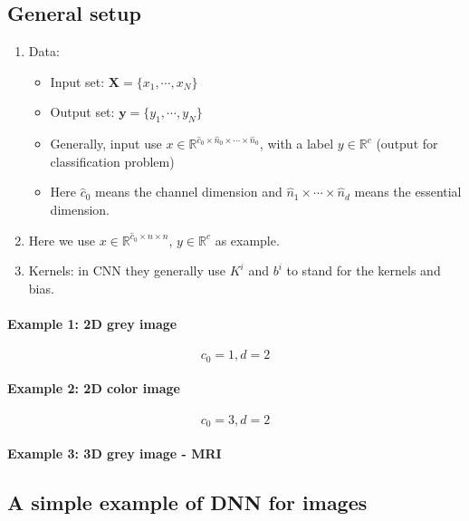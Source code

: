 \subsection{General setup}
\begin{enumerate}
	\item Data:
	\begin{itemize}
		\item Input set: $\bm{X} = \{x_1, \cdots, x_N\}$
		\item Output set: $\bm{y} =  \{y_1, \cdots, y_N\}$
		\item Generally,  input use $x \in \mathbb{R}^{\hat c_0 \times \hat n_0\times \cdots \times \hat n_0 }$, with a label $y \in \mathbb{R}^c$ (output for classification problem)
		\item Here $\hat c_0$ means the channel dimension and $\hat n_1\times \cdots \times \hat n_d$ means the essential dimension.
	\end{itemize}
	\item Here we use $x \in \mathbb{R}^{\hat c_0 \times n \times n} $,
	$y \in \mathbb{R}^c$ as example.
	\item Kernels: in CNN they generally use $K^i$ and $b^i$ to stand for the kernels and bias.  
\end{enumerate}

\paragraph{Example 1: 2D grey image}
\begin{equation}\label{2DGreyImage}
c_0=1, d=2  
\end{equation}
\paragraph{Example 2: 2D color image}
\begin{equation}\label{2DColorImage}
c_0=3, d=2  
\end{equation}
\paragraph{Example 3: 3D grey image - MRI}


\subsection{A simple example of DNN for images}

